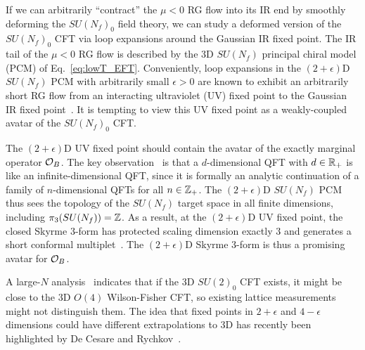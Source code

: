\documentclass[
 reprint,







nofootinbib,


 amsmath,amssymb,
 aps,
 prd






tightenlines
]{revtex4-2}
\begin{document}
If we can arbitrarily ``contract'' the $\mu<0$ RG flow into its IR end by smoothly
deforming the $SU(N_f)_0$ field theory, we can study a deformed version of the $SU(N_f)_0$ CFT via
loop expansions around the Gaussian IR fixed point. The IR tail of
the $\mu<0$ RG flow is described by the 3D $SU(N_f)$ principal chiral model
(PCM) of Eq.~\eqref{eq:lowT_EFT}.
Conveniently, loop expansions in the $(2+\epsilon)$D $SU(N_f)$ PCM with
arbitrarily small $\epsilon>0$ are known to exhibit an arbitrarily short
RG flow from an interacting ultraviolet (UV) fixed point to the Gaussian
IR fixed point~\cite{ZinnJustin_book}. It is tempting to view this UV
fixed point as a weakly-coupled avatar of the $SU(N_f)_0$ CFT.

The $(2+\epsilon)$D UV fixed point should contain the avatar of the
exactly marginal operator $\mathcal{O}_B$.
The key observation~\cite{Nahum:2015jya,Jones:2024ept,DeCesare:2025ukl,DeCesare:2026dwm}
is that a $d$-dimensional QFT with $d\in\mathbb{R}_+$ is like an
infinite-dimensional QFT, since it is formally an analytic continuation
of a family of $n$-dimensional QFTs for all $n\in\mathbb{Z}_+$. The
$(2+\epsilon)$D $SU(N_f)$ PCM thus sees the topology of the $SU(N_f)$
target space in all finite dimensions, including $\pi_3(SU(N_f))=\mathbb{Z}$.
As a result, at the $(2+\epsilon)$D UV fixed point, the closed Skyrme
3-form has protected scaling dimension exactly $3$ and generates a short
conformal multiplet~\cite{DeCesare:2025ukl}. The $(2+\epsilon)$D Skyrme 3-form is thus a
promising avatar for $\mathcal{O}_B$.

A large-$N$ analysis~\cite{DeCesare:2025ukl} indicates that if the 3D
$SU(2)_0$ CFT exists, it might be close to the 3D $O(4)$ Wilson-Fisher
CFT, so existing lattice measurements~\cite{Philipsen:2021qji} might not
distinguish them. The idea that fixed points in $2+\epsilon$ and $4-\epsilon$
dimensions could have different extrapolations to 3D has recently been
highlighted by De Cesare and Rychkov~\cite{DeCesare:2025ukl,DeCesare:2026dwm}.
\end{document}
